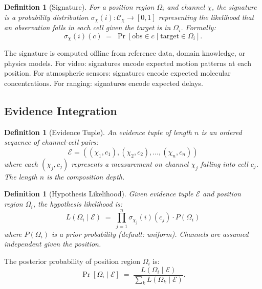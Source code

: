 \documentclass[twocolumn,10pt]{article}
\newtheorem{definition}[theorem]{Definition}
\newcommand{\calC}{\mathcal{C}}     %
\begin{document}
\begin{definition}[Signature]
\label{def:sig}
For a position region $\Omega_i$ and channel $\chi$, the \emph{signature}
is a probability distribution $\sigma_\chi(i) : \calC_\chi \to [0,1]$
representing the likelihood that an observation falls in each cell
given the target is in $\Omega_i$. Formally:
\begin{equation}
  \sigma_\chi(i)(c) \;=\; \Pr[\text{obs} \in c \mid \text{target} \in \Omega_i].
  \label{eq:sig}
\end{equation}
\end{definition}

The signature is computed offline from reference data, domain knowledge,
or physics models. For video: signatures encode expected motion patterns
at each position. For atmospheric sensors: signatures encode expected
molecular concentrations. For ranging: signatures encode expected delays.

\subsection{Evidence Integration}

\begin{definition}[Evidence Tuple]
\label{def:evidence}
An \emph{evidence tuple} of length $n$ is an ordered sequence of channel-cell
pairs:
\begin{equation}
  \mathcal{E} = ((\chi_1, c_1), (\chi_2, c_2), \ldots, (\chi_n, c_n))
  \label{eq:evidence}
\end{equation}
where each $(\chi_j, c_j)$ represents a measurement on channel $\chi_j$
falling into cell $c_j$. The length $n$ is the \emph{composition depth}.
\end{definition}

\begin{definition}[Hypothesis Likelihood]
\label{def:hyp-like}
Given evidence tuple $\mathcal{E}$ and position region $\Omega_i$, the
\emph{hypothesis likelihood} is:
\begin{equation}
  L(\Omega_i \mid \mathcal{E})
  \;=\; \prod_{j=1}^{n} \sigma_{\chi_j}(i)(c_j) \cdot P(\Omega_i)
  \label{eq:likelihood}
\end{equation}
where $P(\Omega_i)$ is a prior probability (default: uniform). Channels are
assumed independent given the position.
\end{definition}

The posterior probability of position region $\Omega_i$ is:
\begin{equation}
  \Pr[\Omega_i \mid \mathcal{E}]
  \;=\; \frac{L(\Omega_i \mid \mathcal{E})}{\sum_{k} L(\Omega_k \mid \mathcal{E})}.
  \label{eq:posterior}
\end{equation}
\end{document}
